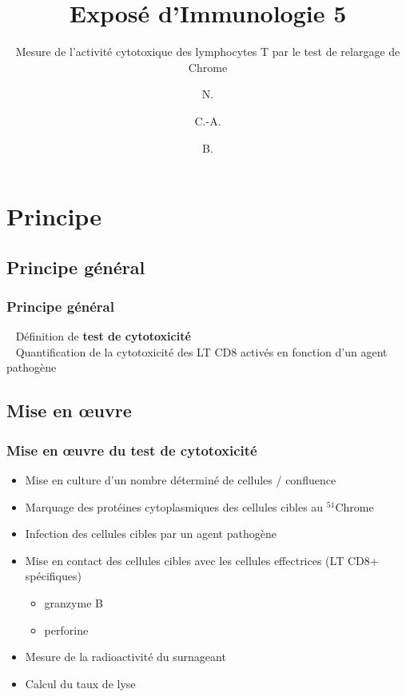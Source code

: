 \documentclass[12pt]{beamer}
\author{N. \bsc{Ribero-Rios} \and C.-A. \bsc{Romain} \and B. \bsc{Rouger}}
\title{Exposé d'Immunologie 5}
\subtitle{Mesure de l’activité cytotoxique des lymphocytes T par le test de relargage de Chrome}
\date{}
\begin{document}
\maketitle


\begin{frame}
  \transuncover
  \tableofcontents
\end{frame}


\section{Principe}
\subsection{Principe général}
\begin{frame}
  \transuncover
  \frametitle{Principe général}
  
  \textbullet~ Définition de \textbf{test de cytotoxicité}\\
  \vfill
  \textbullet~ Quantification de la cytotoxicité des LT CD8 activés en fonction d'un agent pathogène
  
\end{frame}


\subsection{Mise en \oe{}uvre}
\begin{frame}
  \transuncover
  \frametitle{Mise en \oe{}uvre du test de cytotoxicité}

  \begin{minipage}{0.45\linewidth}
    \begin{itemize}
    \item Mise en culture d'un nombre déterminé de cellules / confluence
    \item Marquage des protéines cytoplasmiques des cellules cibles au $^{51}$Chrome
    \item Infection des cellules cibles par un agent pathogène
    \end{itemize}
  \end{minipage}
  \vline
  \begin{minipage}{0.45\linewidth}
    \begin{itemize}
    \item Mise en contact des cellules cibles avec les cellules effectrices (LT CD8+ spécifiques)
      \begin{itemize}
      \item granzyme B
      \item perforine
      \end{itemize}
    \item Mesure de la radioactivité du surnageant
    \item Calcul du taux de lyse
    \end{itemize}
  \end{minipage}
\end{frame}
\end{document}
